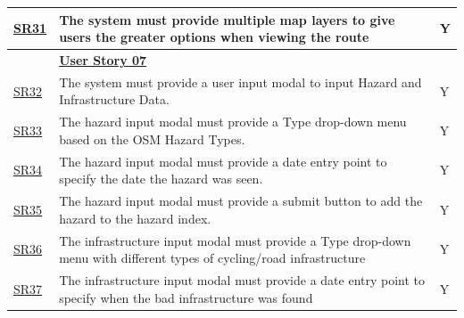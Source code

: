 \begin{table}[!htb]
\begin{tabularx}{\textwidth}{ p{1cm} p{11cm} p{1cm} }
        \hyperref[SR:31]{SR31} & The system must provide multiple map layers to give users the greater options when viewing the route & Y\\ 
        \hline
        & \textbf{\hyperref[tab:user-story-07]{User Story 07}}  \\
        \hyperref[SR:32]{SR32} & The system must provide a user input modal to input Hazard and Infrastructure Data. & Y \\
        \hyperref[SR:33]{SR33} & The hazard input modal must provide a Type drop-down menu based on the OSM Hazard Types. & Y\\
        \hyperref[SR:34]{SR34} & The hazard input modal must provide a date entry point to specify the date the hazard was seen. & Y\\
        \hyperref[SR:35]{SR35} & The hazard input modal must provide a submit button to add the hazard to the hazard index. & Y\\
        \hyperref[SR:36]{SR36} & The infrastructure input modal must provide a Type drop-down menu with different types of cycling/road infrastructure & Y\\
        \hyperref[SR:37]{SR37} & The infrastructure input modal must provide a date entry point to specify when the bad infrastructure was found & Y\\
        \hline
    \end{tabularx}
\end{table}
\clearpage

